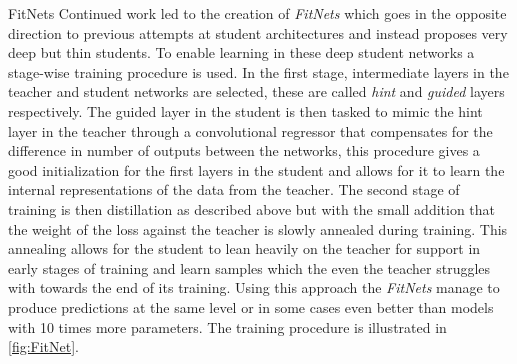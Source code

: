 \documentclass{kththesis}
\newcommand{\bibentry}[1]{\parencite{#1}}
\newcommand{\subsubsubsection}{}
\begin{document}
\subsubsubsection{FitNets}
Continued work led to the creation of \emph{FitNets}
\bibentry{romero2014fitnets} which goes in the opposite direction to previous
attempts at student architectures and instead proposes very deep but thin
students. To enable learning in these deep student networks a stage-wise
training procedure is used. In the first stage, intermediate layers in the
teacher and student networks are selected, these are called \emph{hint} and
\emph{guided} layers respectively. The guided layer in the student is then
tasked to mimic the hint layer in the teacher through a convolutional regressor
that compensates for the difference in number of outputs between the networks,
this procedure gives a good initialization for the first layers in the student
and allows for it to learn the internal representations of the data from the
teacher. The second stage of training is then distillation as described above
but with the small addition that the weight of the loss against the teacher is
slowly annealed during training. This annealing allows for the student to lean
heavily on the teacher for support in early stages of training and learn samples
which the even the teacher struggles with towards the end of its training. Using
this approach the \emph{FitNets} manage to produce predictions at the same level
or in some cases even better than models with 10 times more parameters. The
training procedure is illustrated in \cref{fig:FitNet}.
\end{document}

